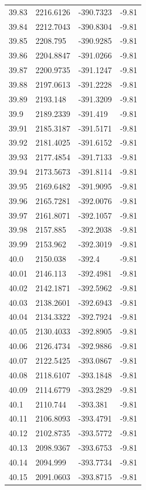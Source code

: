 \begin{table}[H]
\begin{tabular}{llll}
39.83 & 2216.6126 & -390.7323 & -9.81 \\
39.84 & 2212.7043 & -390.8304 & -9.81 \\
39.85 & 2208.795 & -390.9285 & -9.81 \\
39.86 & 2204.8847 & -391.0266 & -9.81 \\
39.87 & 2200.9735 & -391.1247 & -9.81 \\
39.88 & 2197.0613 & -391.2228 & -9.81 \\
39.89 & 2193.148 & -391.3209 & -9.81 \\
39.9 & 2189.2339 & -391.419 & -9.81 \\
39.91 & 2185.3187 & -391.5171 & -9.81 \\
39.92 & 2181.4025 & -391.6152 & -9.81 \\
39.93 & 2177.4854 & -391.7133 & -9.81 \\
39.94 & 2173.5673 & -391.8114 & -9.81 \\
39.95 & 2169.6482 & -391.9095 & -9.81 \\
39.96 & 2165.7281 & -392.0076 & -9.81 \\
39.97 & 2161.8071 & -392.1057 & -9.81 \\
39.98 & 2157.885 & -392.2038 & -9.81 \\
39.99 & 2153.962 & -392.3019 & -9.81 \\
40.0 & 2150.038 & -392.4 & -9.81 \\
40.01 & 2146.113 & -392.4981 & -9.81 \\
40.02 & 2142.1871 & -392.5962 & -9.81 \\
40.03 & 2138.2601 & -392.6943 & -9.81 \\
40.04 & 2134.3322 & -392.7924 & -9.81 \\
40.05 & 2130.4033 & -392.8905 & -9.81 \\
40.06 & 2126.4734 & -392.9886 & -9.81 \\
40.07 & 2122.5425 & -393.0867 & -9.81 \\
40.08 & 2118.6107 & -393.1848 & -9.81 \\
40.09 & 2114.6779 & -393.2829 & -9.81 \\
40.1 & 2110.744 & -393.381 & -9.81 \\
40.11 & 2106.8093 & -393.4791 & -9.81 \\
40.12 & 2102.8735 & -393.5772 & -9.81 \\
40.13 & 2098.9367 & -393.6753 & -9.81 \\
40.14 & 2094.999 & -393.7734 & -9.81 \\
40.15 & 2091.0603 & -393.8715 & -9.81 \\

\end{tabular}
\end{table}
